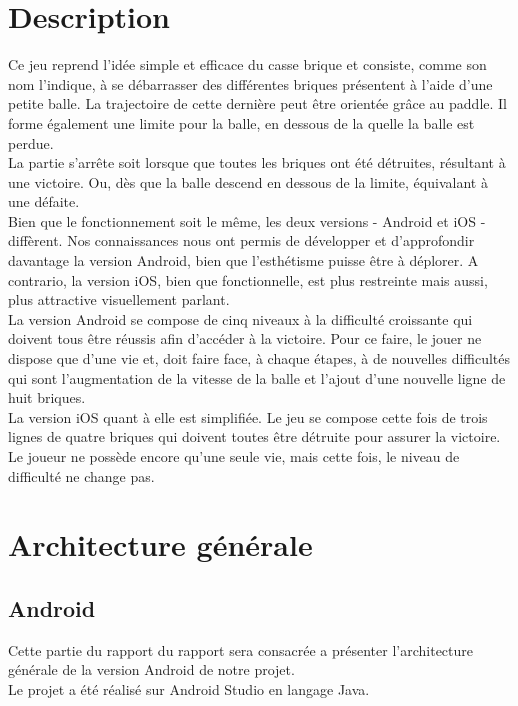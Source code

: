 \documentclass[a4paper]{article}
\begin{document}
\section{Description}
Ce jeu reprend l’idée simple et efficace du casse brique et consiste, comme son nom l'indique, à se débarrasser des différentes briques présentent à l'aide d'une petite balle. La trajectoire de cette dernière peut être orientée grâce au paddle. Il forme également une limite pour la balle, en dessous de la quelle la balle est perdue.\\
La partie s'arrête soit lorsque que toutes les briques ont été détruites, résultant à une victoire. Ou, dès que la balle descend en dessous de la limite, équivalant à une défaite.\\
Bien que le fonctionnement soit le même, les deux versions - Android et iOS - diffèrent. Nos connaissances nous ont permis de développer et d'approfondir davantage la version Android, bien que l'esthétisme puisse être à déplorer. 
A contrario, la version iOS, bien que fonctionnelle, est plus restreinte mais aussi, plus attractive visuellement parlant.\\
La version Android se compose de cinq niveaux à la difficulté croissante qui doivent tous être réussis afin d'accéder à la victoire. Pour ce faire, le jouer ne dispose que d'une vie et, doit faire face, à chaque étapes, à de nouvelles difficultés qui sont l'augmentation de la vitesse de la balle et l'ajout d'une nouvelle ligne de huit briques.\\
La version iOS quant à elle est simplifiée. Le jeu se compose cette fois de trois lignes de quatre briques qui doivent toutes être détruite pour assurer la victoire. Le joueur ne possède encore qu'une seule vie, mais cette fois, le niveau de difficulté ne change pas.\\

\newpage
\section{Architecture générale}
\subsection{Android}
Cette partie du rapport du rapport sera consacrée a présenter l'architecture générale de la version Android de notre projet.\\
Le projet a été réalisé sur Android Studio en langage Java.
\end{document}
